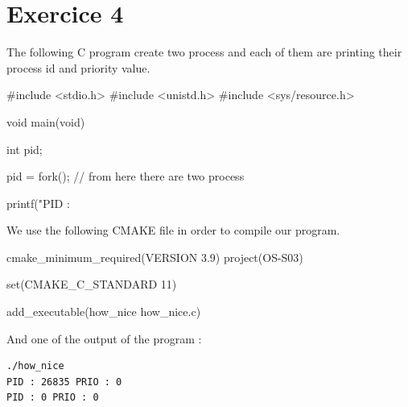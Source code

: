 \documentclass[a4paper,11pt]{report}
\begin{document}
\FloatBarrier

\newpage

\section*{Exercice 4}

The following C program create two process and each of them are printing their
process id and priority value.

\begin{ccode}
#include <stdio.h>
#include <unistd.h>
#include <sys/resource.h>

void main(void)
{
    int pid;

    pid = fork();
    // from here there are two process

    printf("PID : %
}
\end{ccode}

We use the following CMAKE file in order to compile our program.

\begin{cmakecode}
cmake_minimum_required(VERSION 3.9)
project(OS-S03)

set(CMAKE_C_STANDARD 11)

add_executable(how_nice how_nice.c)
\end{cmakecode}

And one of the output of the program :

\begin{verbatim}
./how_nice
PID : 26835 PRIO : 0
PID : 0 PRIO : 0
\end{verbatim}
\end{document}
